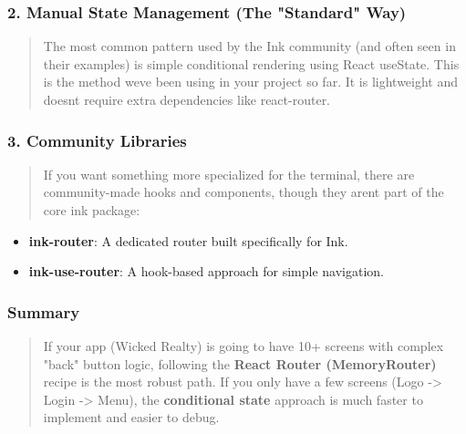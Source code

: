 \documentclass[
]{article}
\begin{document}
\hypertarget{manual-state-management-the-standard-way}{%
\subsubsection{\texorpdfstring{\textbf{2. Manual State Management (The
"Standard"
Way)}}{2. Manual State Management (The "Standard" Way)}}\label{manual-state-management-the-standard-way}}

\begin{quote}
The most common pattern used by the Ink community (and often seen in
their examples) is simple conditional rendering using React useState.
This is the method we\textquotesingle ve been using in your project so
far. It is lightweight and doesn\textquotesingle t require extra
dependencies like react-router.
\end{quote}

\hypertarget{community-libraries}{%
\subsubsection{\texorpdfstring{\textbf{3. Community
Libraries}}{3. Community Libraries}}\label{community-libraries}}

\begin{quote}
If you want something more specialized for the terminal, there are
community-made hooks and components, though they aren\textquotesingle t
part of the core ink package:
\end{quote}

\begin{itemize}
\item
  \textbf{ink-router}: A dedicated router built specifically for Ink.
\item
  \textbf{ink-use-router}: A hook-based approach for simple navigation.
\end{itemize}

\hypertarget{summary}{%
\subsubsection{\texorpdfstring{\textbf{Summary}}{Summary}}\label{summary}}

\begin{quote}
If your app (Wicked Realty) is going to have 10+ screens with complex
"back" button logic, following the \textbf{React Router (MemoryRouter)}
recipe is the most robust path. If you only have a few screens (Logo
-\textgreater{} Login -\textgreater{} Menu), the \textbf{conditional
state} approach is much faster to implement and easier to debug.
\end{quote}
\end{document}
